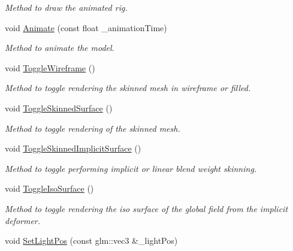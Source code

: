 \begin{DoxyCompactItemize}
\begin{DoxyCompactList}\small\item\em Method to draw the animated rig. \end{DoxyCompactList}\item 
void \hyperlink{classModel_a72cc0344f05776e6bbbb9ec82ed0b7b6}{Animate} (const float \+\_\+animation\+Time)
\begin{DoxyCompactList}\small\item\em Method to animate the model. \end{DoxyCompactList}\item 
void \hyperlink{classModel_ad8697962971f8443f3e1bfd474e6ac20}{Toggle\+Wireframe} ()\hypertarget{classModel_ad8697962971f8443f3e1bfd474e6ac20}{}\label{classModel_ad8697962971f8443f3e1bfd474e6ac20}

\begin{DoxyCompactList}\small\item\em Method to toggle rendering the skinned mesh in wireframe or filled. \end{DoxyCompactList}\item 
void \hyperlink{classModel_a7ce564f5eb3e962970bc285305a352f7}{Toggle\+Skinned\+Surface} ()\hypertarget{classModel_a7ce564f5eb3e962970bc285305a352f7}{}\label{classModel_a7ce564f5eb3e962970bc285305a352f7}

\begin{DoxyCompactList}\small\item\em Method to toggle rendering of the skinned mesh. \end{DoxyCompactList}\item 
void \hyperlink{classModel_ad453680f0603420e226c2aa4a74db9dd}{Toggle\+Skinned\+Implicit\+Surface} ()\hypertarget{classModel_ad453680f0603420e226c2aa4a74db9dd}{}\label{classModel_ad453680f0603420e226c2aa4a74db9dd}

\begin{DoxyCompactList}\small\item\em Method to toggle performing implicit or linear blend weight skinning. \end{DoxyCompactList}\item 
void \hyperlink{classModel_ac97e2c6ccbe0937d0c7b5aed1bfceb04}{Toggle\+Iso\+Surface} ()\hypertarget{classModel_ac97e2c6ccbe0937d0c7b5aed1bfceb04}{}\label{classModel_ac97e2c6ccbe0937d0c7b5aed1bfceb04}

\begin{DoxyCompactList}\small\item\em Method to toggle rendering the iso surface of the global field from the implicit deformer. \end{DoxyCompactList}\item 
void \hyperlink{classModel_afad9aa7af2bdbdf511dcd3e0748a2d9a}{Set\+Light\+Pos} (const glm\+::vec3 \&\+\_\+light\+Pos)\hypertarget{classModel_afad9aa7af2bdbdf511dcd3e0748a2d9a}{}\label{classModel_afad9aa7af2bdbdf511dcd3e0748a2d9a}


\end{DoxyCompactItemize}

